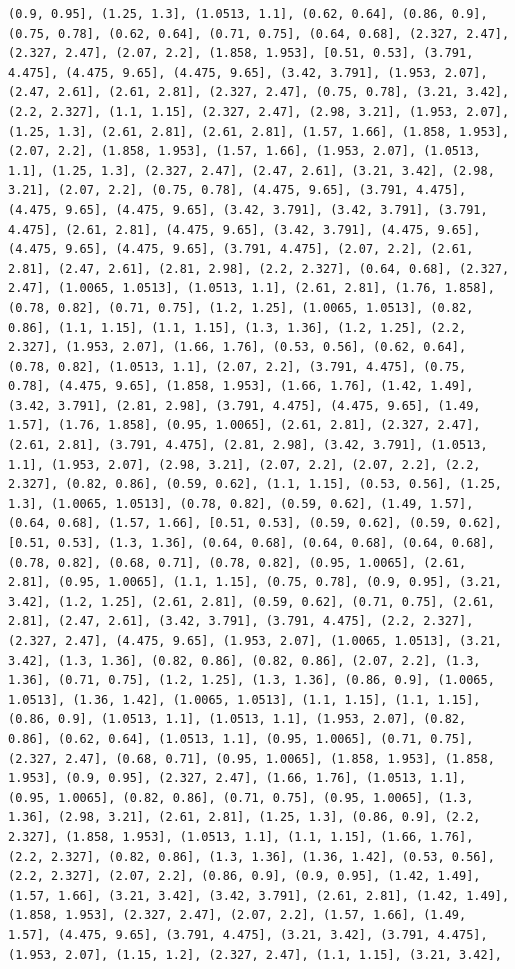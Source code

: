 \documentclass[12pt,fleqn]{article}\usepackage{../common}
\begin{document}
\begin{verbatim}
(0.9, 0.95], (1.25, 1.3], (1.0513, 1.1], (0.62, 0.64], (0.86, 0.9], (0.75, 0.78], (0.62, 0.64], (0.71, 0.75], (0.64, 0.68], (2.327, 2.47], (2.327, 2.47], (2.07, 2.2], (1.858, 1.953], [0.51, 0.53], (3.791, 4.475], (4.475, 9.65], (4.475, 9.65], (3.42, 3.791], (1.953, 2.07], (2.47, 2.61], (2.61, 2.81], (2.327, 2.47], (0.75, 0.78], (3.21, 3.42], (2.2, 2.327], (1.1, 1.15], (2.327, 2.47], (2.98, 3.21], (1.953, 2.07], (1.25, 1.3], (2.61, 2.81], (2.61, 2.81], (1.57, 1.66], (1.858, 1.953], (2.07, 2.2], (1.858, 1.953], (1.57, 1.66], (1.953, 2.07], (1.0513, 1.1], (1.25, 1.3], (2.327, 2.47], (2.47, 2.61], (3.21, 3.42], (2.98, 3.21], (2.07, 2.2], (0.75, 0.78], (4.475, 9.65], (3.791, 4.475], (4.475, 9.65], (4.475, 9.65], (3.42, 3.791], (3.42, 3.791], (3.791, 4.475], (2.61, 2.81], (4.475, 9.65], (3.42, 3.791], (4.475, 9.65], (4.475, 9.65], (4.475, 9.65], (3.791, 4.475], (2.07, 2.2], (2.61, 2.81], (2.47, 2.61], (2.81, 2.98], (2.2, 2.327], (0.64, 0.68], (2.327, 2.47], (1.0065, 1.0513], (1.0513, 1.1], (2.61, 2.81], (1.76, 1.858], (0.78, 0.82], (0.71, 0.75], (1.2, 1.25], (1.0065, 1.0513], (0.82, 0.86], (1.1, 1.15], (1.1, 1.15], (1.3, 1.36], (1.2, 1.25], (2.2, 2.327], (1.953, 2.07], (1.66, 1.76], (0.53, 0.56], (0.62, 0.64], (0.78, 0.82], (1.0513, 1.1], (2.07, 2.2], (3.791, 4.475], (0.75, 0.78], (4.475, 9.65], (1.858, 1.953], (1.66, 1.76], (1.42, 1.49], (3.42, 3.791], (2.81, 2.98], (3.791, 4.475], (4.475, 9.65], (1.49, 1.57], (1.76, 1.858], (0.95, 1.0065], (2.61, 2.81], (2.327, 2.47], (2.61, 2.81], (3.791, 4.475], (2.81, 2.98], (3.42, 3.791], (1.0513, 1.1], (1.953, 2.07], (2.98, 3.21], (2.07, 2.2], (2.07, 2.2], (2.2, 2.327], (0.82, 0.86], (0.59, 0.62], (1.1, 1.15], (0.53, 0.56], (1.25, 1.3], (1.0065, 1.0513], (0.78, 0.82], (0.59, 0.62], (1.49, 1.57], (0.64, 0.68], (1.57, 1.66], [0.51, 0.53], (0.59, 0.62], (0.59, 0.62], [0.51, 0.53], (1.3, 1.36], (0.64, 0.68], (0.64, 0.68], (0.64, 0.68], (0.78, 0.82], (0.68, 0.71], (0.78, 0.82], (0.95, 1.0065], (2.61, 2.81], (0.95, 1.0065], (1.1, 1.15], (0.75, 0.78], (0.9, 0.95], (3.21, 3.42], (1.2, 1.25], (2.61, 2.81], (0.59, 0.62], (0.71, 0.75], (2.61, 2.81], (2.47, 2.61], (3.42, 3.791], (3.791, 4.475], (2.2, 2.327], (2.327, 2.47], (4.475, 9.65], (1.953, 2.07], (1.0065, 1.0513], (3.21, 3.42], (1.3, 1.36], (0.82, 0.86], (0.82, 0.86], (2.07, 2.2], (1.3, 1.36], (0.71, 0.75], (1.2, 1.25], (1.3, 1.36], (0.86, 0.9], (1.0065, 1.0513], (1.36, 1.42], (1.0065, 1.0513], (1.1, 1.15], (1.1, 1.15], (0.86, 0.9], (1.0513, 1.1], (1.0513, 1.1], (1.953, 2.07], (0.82, 0.86], (0.62, 0.64], (1.0513, 1.1], (0.95, 1.0065], (0.71, 0.75], (2.327, 2.47], (0.68, 0.71], (0.95, 1.0065], (1.858, 1.953], (1.858, 1.953], (0.9, 0.95], (2.327, 2.47], (1.66, 1.76], (1.0513, 1.1], (0.95, 1.0065], (0.82, 0.86], (0.71, 0.75], (0.95, 1.0065], (1.3, 1.36], (2.98, 3.21], (2.61, 2.81], (1.25, 1.3], (0.86, 0.9], (2.2, 2.327], (1.858, 1.953], (1.0513, 1.1], (1.1, 1.15], (1.66, 1.76], (2.2, 2.327], (0.82, 0.86], (1.3, 1.36], (1.36, 1.42], (0.53, 0.56], (2.2, 2.327], (2.07, 2.2], (0.86, 0.9], (0.9, 0.95], (1.42, 1.49], (1.57, 1.66], (3.21, 3.42], (3.42, 3.791], (2.61, 2.81], (1.42, 1.49], (1.858, 1.953], (2.327, 2.47], (2.07, 2.2], (1.57, 1.66], (1.49, 1.57], (4.475, 9.65], (3.791, 4.475], (3.21, 3.42], (3.791, 4.475], (1.953, 2.07], (1.15, 1.2], (2.327, 2.47], (1.1, 1.15], (3.21, 3.42], 
\end{verbatim}
\end{document}
